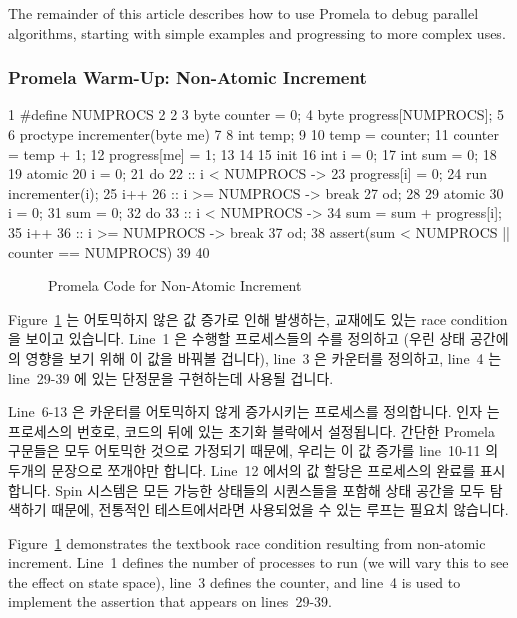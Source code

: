 The remainder of this article describes how to use Promela to debug
parallel algorithms, starting with simple examples and progressing to
more complex uses.
\fi

\subsubsection{Promela Warm-Up: Non-Atomic Increment}
\label{sec:formal:Promela Warm-Up: Non-Atomic Increment}

{ \scriptsize
\begin{verbbox}
  1 #define NUMPROCS 2
  2
  3 byte counter = 0;
  4 byte progress[NUMPROCS];
  5
  6 proctype incrementer(byte me)
  7 {
  8   int temp;
  9
 10   temp = counter;
 11   counter = temp + 1;
 12   progress[me] = 1;
 13 }
 14
 15 init {
 16   int i = 0;
 17   int sum = 0;
 18
 19   atomic {
 20     i = 0;
 21     do
 22     :: i < NUMPROCS ->
 23       progress[i] = 0;
 24       run incrementer(i);
 25       i++
 26     :: i >= NUMPROCS -> break
 27     od;
 28   }
 29   atomic {
 30     i = 0;
 31     sum = 0;
 32     do
 33     :: i < NUMPROCS ->
 34       sum = sum + progress[i];
 35       i++
 36     :: i >= NUMPROCS -> break
 37     od;
 38     assert(sum < NUMPROCS || counter == NUMPROCS)
 39   }
 40 }
\end{verbbox}
}
\begin{figure}[tbp]
\centering
\theverbbox
\caption{Promela Code for Non-Atomic Increment}
\label{fig:analysis:Promela Code for Non-Atomic Increment}
\end{figure}

Figure~\ref{fig:analysis:Promela Code for Non-Atomic Increment}
는 어토믹하지 않은 값 증가로 인해 발생하는, 교재에도 있는 race condition 을
보이고 있습니다.
Line~1 은 수행할 프로세스들의 수를 정의하고 (우린 상태 공간에의 영향을 보기
위해 이 값을 바꿔볼 겁니다), line~3 은 카운터를 정의하고, line~4 는 line~29-39
에 있는 단정문을 구현하는데 사용될 겁니다.

Line~6-13 은 카운터를 어토믹하지 않게 증가시키는 프로세스를 정의합니다.
인자  는 프로세스의 번호로, 코드의 뒤에 있는 초기화 블락에서 설정됩니다.
간단한 Promela 구문들은 모두 어토믹한 것으로 가정되기 때문에, 우리는 이 값
증가를 line~10-11 의 두개의 문장으로 쪼개야만 합니다.
Line~12 에서의 값 할당은 프로세스의 완료를 표시합니다.
Spin 시스템은 모든 가능한 상태들의 시퀀스들을 포함해 상태 공간을 모두 탐색하기
때문에, 전통적인 테스트에서라면 사용되었을 수 있는 루프는 필요치 않습니다.
\iffalse

Figure~\ref{fig:analysis:Promela Code for Non-Atomic Increment}
demonstrates the textbook race condition
resulting from non-atomic increment.
Line~1 defines the number of processes to run (we will vary this
to see the effect on state space), line~3 defines the counter,
and line~4 is used to implement the assertion that appears on
lines~29-39.

